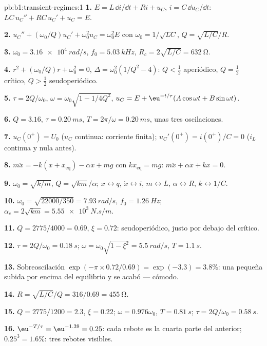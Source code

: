 \begin{solution}{pb:b1:transient-regimes:1}
\textbf{1.} $E = L\,\dd i/\dd t + Ri + u_C$, $i = C\,\dd u_C/\dd t$:
$LC\,u_C'' + RC\,u_C' + u_C = E$.

\textbf{2.} $u_C'' + (\omega_0/Q)u_C' + \omega_0^2u_C = \omega_0^2E$ con
$\omega_0 = 1/\sqrt{LC}$, $Q = \sqrt{L/C}/R$.

\textbf{3.} $\omega_0 = \qty{3.16e4}{rad/s}$, $f_0 = \qty{5.03}{kHz}$,
$R_c = 2\sqrt{L/C} = \qty{632}{\ohm}$.

\textbf{4.} $r^2 + (\omega_0/Q)r + \omega_0^2 = 0$, $\Delta = \omega_0^2(1/Q^2
- 4)$: $Q < \tfrac12$ aperiódico, $Q = \tfrac12$ crítico, $Q > \tfrac12$
seudoperiódico.

\textbf{5.} $\tau = 2Q/\omega_0$, $\omega = \omega_0\sqrt{1 - 1/4Q^2}$,
$u_C = E + \eu^{-t/\tau}(A\cos\omega t + B\sin\omega t)$.

\textbf{6.} $Q = 3.16$, $\tau = \qty{0.20}{ms}$, $T = 2\pi/\omega =
\qty{0.20}{ms}$, unas tres oscilaciones.

\textbf{7.} $u_C(0^+) = U_0$ ($u_C$ continua: corriente finita);
$u_C'(0^+) = i(0^+)/C = 0$ ($i_L$ continua y nula antes).

\textbf{8.} $m\ddot x = -k(x + x_{\text{eq}}) - \alpha\dot x + mg$ con
$kx_{\text{eq}} = mg$: $m\ddot x + \alpha\dot x + kx = 0$.

\textbf{9.} $\omega_0 = \sqrt{k/m}$, $Q = \sqrt{km}/\alpha$; $x \leftrightarrow
q$, $\dot x \leftrightarrow i$, $m \leftrightarrow L$, $\alpha \leftrightarrow
R$, $k \leftrightarrow 1/C$.

\textbf{10.} $\omega_0 = \sqrt{22000/350} = \qty{7.93}{rad/s}$, $f_0 =
\qty{1.26}{Hz}$; $\alpha_c = 2\sqrt{km} = \qty{5.55e3}{N.s/m}$.

\textbf{11.} $Q = 2775/4000 = 0.69$, $\xi = 0.72$: seudoperiódico, justo
por debajo del crítico.

\textbf{12.} $\tau = 2Q/\omega_0 = \qty{0.18}{s}$; $\omega = \omega_0\sqrt{1
- \xi^2} = \qty{5.5}{rad/s}$, $T = \qty{1.1}{s}$.

\textbf{13.} Sobreoscilación $\exp(-\pi \times 0.72/0.69) = \exp(-3.3) = 3.8\%$:
una pequeña subida por encima del equilibrio y se acabó --- cómodo.

\textbf{14.} $R = \sqrt{L/C}/Q = 316/0.69 = \qty{455}{\ohm}$.

\textbf{15.} $Q = 2775/1200 = 2.3$, $\xi = 0.22$; $\omega = 0.976\omega_0$,
$T = \qty{0.81}{s}$; $\tau = 2Q/\omega_0 = \qty{0.58}{s}$.

\textbf{16.} $\eu^{-T/\tau} = \eu^{-1.39} = 0.25$: cada rebote es la cuarta
parte del anterior; $0.25^3 = 1.6\%$: tres rebotes visibles.


\end{solution}
